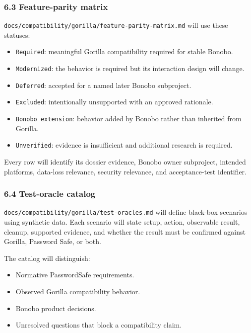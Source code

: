 \documentclass[
  letterpaper,
]{article}
\newcommand{\passthrough}[1]{#1}
\providecommand{\tightlist}{%
  \setlength{\itemsep}{0pt}\setlength{\parskip}{0pt}}
\begin{document}
\subsubsection{6.3 Feature-parity matrix}\label{63-feature-parity-matrix}

\nolinkurl{docs/compatibility/gorilla/feature-parity-matrix.md} will use these statuses:

\begin{itemize}
\tightlist
\item
  \passthrough{\lstinline!Required!}: meaningful Gorilla compatibility required for stable Bonobo.
\item
  \nolinkurl{Modernized}: the behavior is required but its interaction design will change.
\item
  \passthrough{\lstinline!Deferred!}: accepted for a named later Bonobo subproject.
\item
  \passthrough{\lstinline!Excluded!}: intentionally unsupported with an approved rationale.
\item
  \passthrough{\lstinline!Bonobo extension!}: behavior added by Bonobo rather than inherited from Gorilla.
\item
  \nolinkurl{Unverified}: evidence is insufficient and additional research is required.
\end{itemize}

Every row will identify its dossier evidence, Bonobo owner subproject, intended platforms, data-loss relevance, security
relevance, and acceptance-test identifier.

\subsubsection{6.4 Test-oracle catalog}\label{64-test-oracle-catalog}

\nolinkurl{docs/compatibility/gorilla/test-oracles.md} will define black-box scenarios using synthetic data. Each
scenario will state setup, action, observable result, cleanup, supported evidence, and whether the result must be
confirmed against Gorilla, Password Safe, or both.

The catalog will distinguish:

\begin{itemize}
\tightlist
\item
  Normative PasswordSafe requirements.
\item
  Observed Gorilla compatibility behavior.
\item
  Bonobo product decisions.
\item
  Unresolved questions that block a compatibility claim.
\end{itemize}
\end{document}
